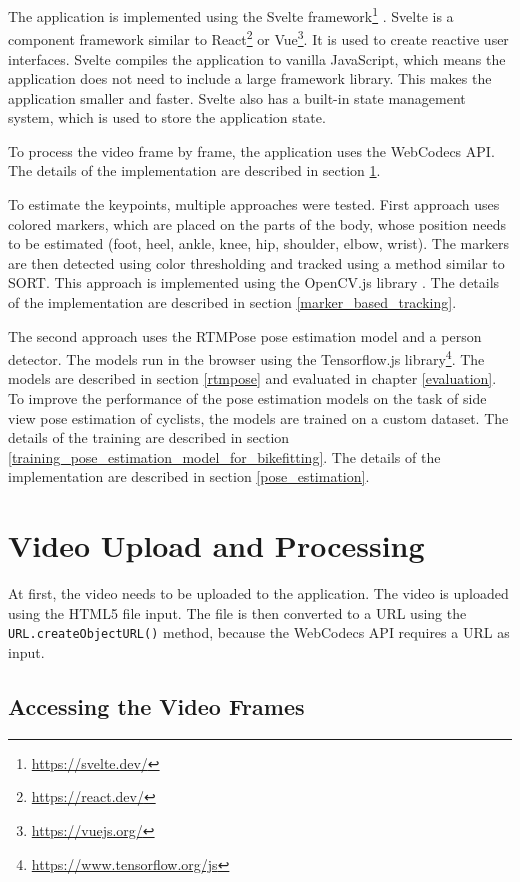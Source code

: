The application is implemented using the Svelte framework\footnote{\url{https://svelte.dev/}} . Svelte is a component framework similar to React\footnote{\url{https://react.dev/}} or Vue\footnote{\url{https://vuejs.org/}}. It is used to create reactive user interfaces. Svelte compiles the application to vanilla JavaScript, which means the application does not need to include a large framework library. This makes the application smaller and faster. Svelte also has a built-in state management system, which is used to store the application state.

To process the video frame by frame, the application uses the WebCodecs API. The details of the implementation are described in section \ref{video_upload_and_processing}.

To estimate the keypoints, multiple approaches were tested. First approach uses colored markers, which are placed on the parts of the body, whose position needs to be estimated (foot, heel, ankle, knee, hip, shoulder, elbow, wrist). The markers are then detected using color thresholding and tracked using a method similar to SORT. This approach is implemented using the OpenCV.js library \cite{opencvjs}. The details of the implementation are described in section \ref{marker_based_tracking}.

The second approach uses the RTMPose pose estimation model and a person detector. The models run in the browser using the Tensorflow.js library\footnote{\url{https://www.tensorflow.org/js}}. The models are described in section \ref{rtmpose} and evaluated in chapter \ref{evaluation}. To improve the performance of the pose estimation models on the task of side view pose estimation of cyclists, the models are trained on a custom dataset. The details of the training are described in section \ref{training_pose_estimation_model_for_bikefitting}. The details of the implementation are described in section \ref{pose_estimation}.


\section{Video Upload and Processing}
\label{video_upload_and_processing}
At first, the video needs to be uploaded to the application. The video is uploaded using the HTML5 file input. The file is then converted to a URL using the \texttt{URL.createObjectURL()} method, because the WebCodecs API requires a URL as input.

\subsection{Accessing the Video Frames}

